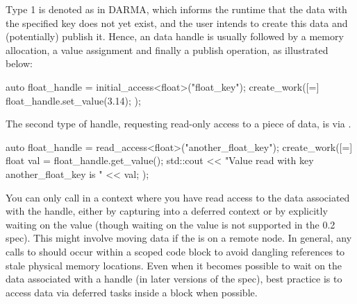 Type 1 is denoted as  in DARMA, 
which informs the runtime that the data with the 
specified key does not yet exist, and the user intends to 
create this data and (potentially) publish it.
Hence, an  data handle is usually 
followed by a memory allocation, a value assignment and 
finally a publish operation, as illustrated below: 

\begin{CppCode}
auto float_handle = initial_access<float>("float_key");
create_work([=]{
  float_handle.set_value(3.14);
});
\end{CppCode}
The second type of handle, requesting read-only access 
to a piece of data, is via . 

\begin{CppCode}
auto float_handle = read_access<float>("another_float_key");
create_work([=]{
  float val = float_handle.get_value();
  std::cout << "Value read with key another_float_key is " << val;  
});
\end{CppCode}
You can only call  in a context where you have read access
to the data associated with the handle, either by capturing into a deferred
context or by explicitly waiting on the value (though waiting on the value is
not supported in the 0.2 spec).
This might involve moving data if the  is on a remote node.
In general, any calls to  should occur 
within a scoped code block to avoid dangling references to stale physical memory locations.
Even when it becomes possible to wait on the data associated with a handle (in
later versions of the spec), best practice is to access data via deferred tasks
inside a  block when possible.

